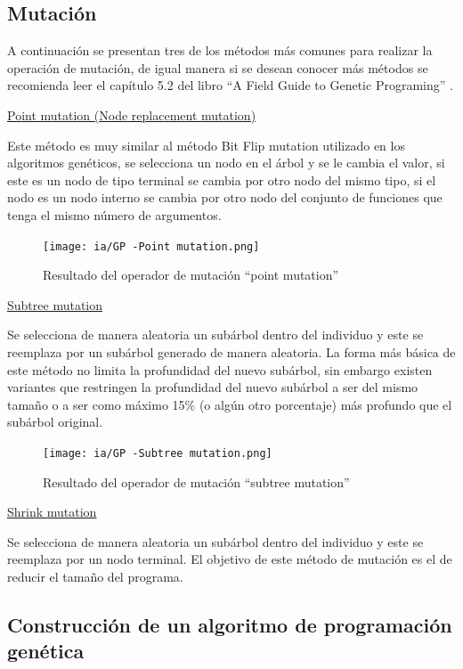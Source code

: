 \documentclass[11pt,fleqn]{book} %
\begin{document}
\subsection{Mutación} 

A continuación se presentan tres de los métodos más comunes para realizar la operación de mutación, de igual manera si se desean conocer más métodos se recomienda leer el capítulo 5.2 del libro “A Field Guide to Genetic Programing” \cite{polilang08gp}.

\underline{Point mutation (Node replacement mutation)}

Este método es muy similar al método Bit Flip mutation utilizado en los algoritmos genéticos, se selecciona un nodo en el árbol y se le cambia el valor, si este es un nodo de tipo terminal se cambia por otro nodo del mismo tipo, si el nodo es un nodo interno se cambia por otro nodo del conjunto de funciones que tenga el mismo número de argumentos.

\begin{figure}[ht]
\centering\texttt{[image: ia/GP -Point mutation.png]}
\caption{Resultado del operador de mutación “point mutation”}
\label{fig:GP-Point-mutation} 
\end{figure}

\underline{Subtree mutation}

Se selecciona de manera aleatoria un subárbol dentro del individuo y este se reemplaza por un subárbol generado de manera aleatoria. La forma más básica de este método no limita la profundidad del nuevo subárbol, sin embargo existen variantes que restringen la profundidad del nuevo subárbol a ser del mismo tamaño o a ser como máximo 15\% (o algún otro porcentaje) más profundo que el subárbol original.

\begin{figure}[ht]
\centering\texttt{[image: ia/GP -Subtree mutation.png]}
\caption{Resultado del operador de mutación “subtree mutation”}
\label{fig:GP-Subtree-mutation} 
\end{figure}

\clearpage
\underline{Shrink mutation}

Se selecciona de manera aleatoria un subárbol dentro del individuo y este se reemplaza por un nodo terminal. El objetivo de este método de mutación es el de reducir el tamaño del programa.

\subsection{Construcción de un algoritmo de programación genética} 
\end{document}
